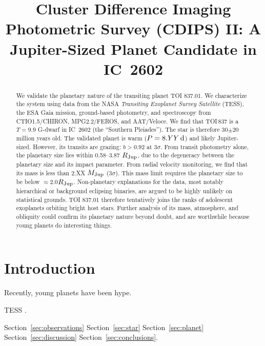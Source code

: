\documentclass[12pt,twocolumn,tighten]{aastex62}
\begin{document}

\title{Cluster Difference Imaging Photometric Survey (CDIPS) II: A
Jupiter-Sized Planet Candidate in IC~2602}



\begin{abstract}
We validate the planetary nature of the transiting planet TOI 837.01.
We characterize the system using data from the NASA {\it Transiting
  Exoplanet Survey Satellite} (TESS), the ESA Gaia mission,
  ground-based photometry, and spectroscopy from CTIO1.5/CHIRON,
  MPG2.2/FEROS, and AAT/Veloce.
We find that TOI$\,$837 is a $T=9.9$ G-dwarf in IC~2602 (the
``Southern Pleiades''). 
The star is therefore 30$\pm$20 million years old.
The validated planet is warm ($P = 8.YY\,{\rm d}$) and likely
  Jupiter-sized. 
However, its transits are grazing: $b > 0.92$ at 3$\sigma$.
From transit photometry alone, the planetary size lies within
  0.58--3.87 $R_{\rm Jup}$, due to the degeneracy
  between the planetary size and its impact parameter.
From radial velocity monitoring, we find that its mass is less than
  2.XX $M_{\rm Jup}$ (3$\sigma$).
This mass limit requires the planetary size to be below
  $\approx$2.0$R_{\rm Jup}$.
Non-planetary explanations for the data, most notably hierarchical or
  background eclipsing binaries, are argued to be highly unlikely on
  statistical grounds.
TOI 837.01 therefore tentatively joins the ranks of adolescent
  exoplanets orbiting bright host stars. Further analysis of its mass,
  atmosphere, and obliquity could confirm its planetary nature beyond
  doubt, and are worthwhile because young planets do interesting
  things.
\end{abstract}




\section{Introduction}

Recently, young planets have been hype.

TESS \citep{ricker_transiting_2015}.

Section~\ref{sec:observations} 
Section~\ref{sec:star}
Section~\ref{sec:planet}
Section~\ref{sec:discussion}
Section~\ref{sec:conclusions}.
\end{document}

